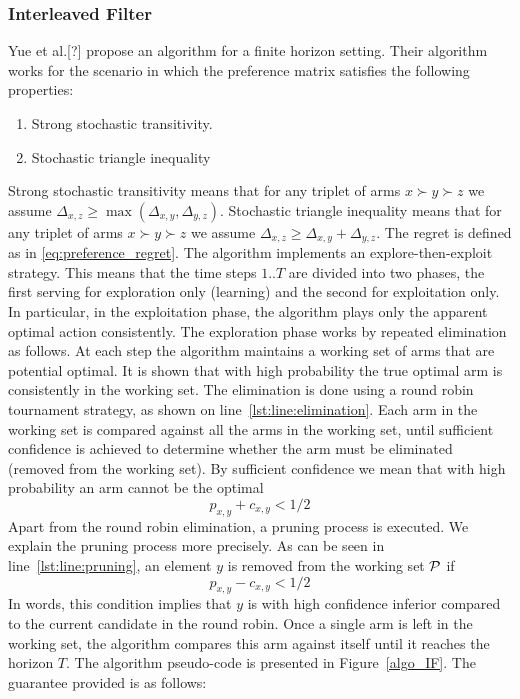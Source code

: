 \documentclass{llncs}
\begin{document}
\subsubsection{Interleaved Filter}
	Yue et al.[?] propose an algorithm for a finite horizon setting. 
	Their algorithm works for the scenario in which the preference matrix satisfies the following properties:

	\begin{enumerate}

		\item Strong stochastic transitivity.

		\item Stochastic triangle inequality

	\end{enumerate}
	Strong stochastic transitivity means that for any triplet of arms $x \succ y \succ z$ we assume $\Delta_{x,z} \geq \max(\Delta_{x,y},\Delta_{y,z})$.
	Stochastic triangle inequality means that for any triplet of arms $x \succ y \succ z$ we assume $\Delta_{x,z} \geq \Delta_{x,y} + \Delta_{y,z}$.
	The regret is defined as in \eqref{eq:preference_regret}.
	The algorithm implements an explore-then-exploit strategy. 
	This means that the time steps $1..T$ are divided into two phases, the first serving for exploration only (learning) and the second for exploitation only. 
	In particular, in the exploitation phase, the algorithm plays only the apparent optimal action consistently.
	The exploration phase works by repeated elimination as follows. 
	At each step the algorithm maintains a working set of arms that are potential optimal. 
	It is shown that with high probability the true optimal arm is consistently in the working set. 
	The elimination is done using a round robin tournament strategy, as shown on line~\ref{lst:line:elimination}. 
	Each arm in the working set is compared against all the arms in the working set, until sufficient confidence is achieved to determine whether the arm must be eliminated (removed from the working set). 
	By sufficient confidence we mean that with high probability an arm cannot be the optimal $$p_{x,y}+c_{x,y}<1/2$$
	Apart from the round robin elimination, a pruning process is executed.
	We explain the pruning process more precisely. 
	As can be seen in line~\ref{lst:line:pruning}, an element $y$ is removed from the working set $\cal P$ if $$p_{x,y}-c_{x,y}<1/2$$ 
	In words, this condition implies that $y$ is with high confidence inferior compared to the current candidate in the round robin.
	Once a single arm is left in the working set, the algorithm compares this arm against itself until it reaches the horizon $T$.
	The algorithm pseudo-code is presented in Figure~\ref{algo_IF}. 
	The guarantee provided is as follows:
\end{document}
